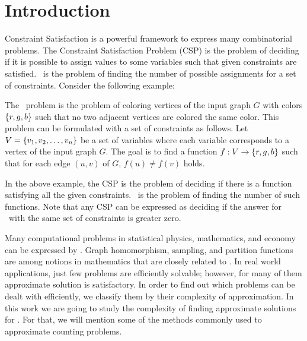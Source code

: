 \chapter{Introduction}
Constraint Satisfaction is a powerful framework to express many combinatorial problems.
The Constraint Satisfaction Problem (CSP) is the problem of deciding if it is possible to
assign values to some variables such that given constraints are satisfied. \ccsp\ 
is the problem of finding the number of possible assignments for a set of constraints.
Consider the following example:

\begin{example}[\tcoloring]\label{exm:3col}
The \tcoloring\ problem is the problem of coloring vertices of the input graph \(G\)
with colors \(\{{r,g,b}\}\) such that no two adjacent vertices are colored the same color.
This problem can be formulated with a set of constraints as follows.
Let \(V=\{{v_1,v_2,\dotsc,v_n}\}\)
be a set of variables where each variable corresponds to a vertex of
the input graph \(G\)\@. The goal is to find a function
\(f:V\to \{{r,g,b}\}\) such that for each edge \((u,v)\) of \(G\), \(f(u)\neq f(v)\) holds.
\end{example}
In the above example,
the CSP is the problem of deciding
if there is a function satisfying all the given constraints. \ccsp\ is the
problem of finding the number of such functions. Note that any CSP can be expressed as 
deciding if the answer for \ccsp\ with the same set of constraints is greater zero.


Many computational problems in statistical physics, mathematics, and economy
can be expressed by \ccsp\@. Graph homomorphism, sampling,
and partition functions are among notions in mathematics
that are closely related to \ccsp\@. 
In real world applications, just few problems are efficiently solvable;
however, for many of them approximate solution is satisfactory. 
In order to find out which problems can be dealt with efficiently, we classify them
by their complexity of approximation. In this work we are going to study the complexity
of finding approximate solutions for \ccsp\@. For that, we will mention some of
the methods commonly used to approximate counting problems.

